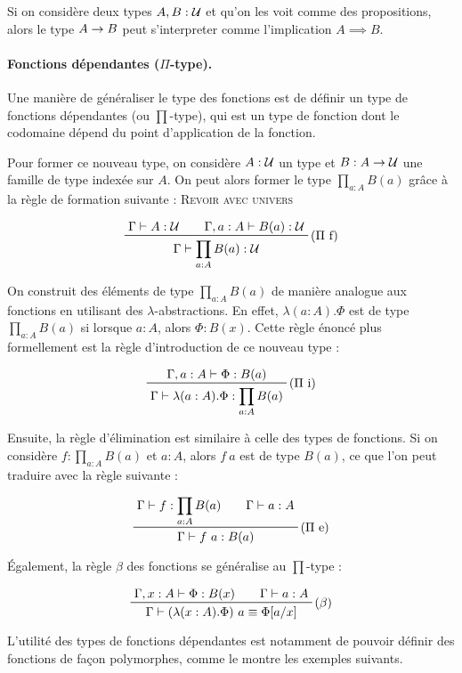 \documentclass[../../rapport.tex]{subfiles}
\begin{document}
  Si on considère deux types $A, B : \mathcal U$ et qu'on les voit comme des propositions,
  alors le type $A \rightarrow B$ peut s'interpreter comme l'implication $A \implies B$.

  \paragraph{Fonctions dépendantes ($\Pi$-type).}

  Une manière de généraliser le type des fonctions est de définir un type de fonctions dépendantes (ou $\prod$-type),
  qui est un type de fonction dont le codomaine dépend du point d'application de la fonction.

  Pour former ce nouveau type, on considère $A : \mathcal U$ un type et $B : A \rightarrow \mathcal U$ une famille de type indexée sur $A$.
  On peut alors former le type $\prod_{a : A}{B(a)}$ grâce à la règle de formation suivante : \textsc{Revoir avec univers}

  $$
  \prfinterspace=2em
  \prftree[r]{($\Pi$ f)}{\Gamma \vdash A : \U}{\Gamma, a : A \vdash B(a) : \U}
    {\Gamma \vdash \prod_{a:A}{B(a)} : \U}
  $$

  On construit des éléments de type $\prod_{a:A}{B(a)}$ de manière analogue aux fonctions en utilisant des $\lambda$-abstractions.
  En effet, $\lambda(a : A). \Phi$ est de type $\prod_{a:A}{B(a)}$ si lorsque $a : A$, alors $\Phi : B(x)$.
  Cette règle énoncé plus formellement est la règle d'introduction de ce nouveau type :

  $$
  \prftree[r]{($\Pi$ i)}{\Gamma, a : A \vdash \Phi : B(a)}
    {\Gamma \vdash \lambda(a : A). \Phi : \prod_{a:A}{B(a)}}
  $$

  Ensuite, la règle d'élimination est similaire à celle des types de fonctions.
  Si on considère $f : \prod_{a:A}B(a)$ et $a : A$, alors $f\ a$ est de type $B(a)$,
  ce que l'on peut traduire avec la règle suivante :

  $$
  \prfinterspace=2em
  \prftree[r]{($\Pi$ e)}{\Gamma \vdash f : \prod_{a:A}{B(a)}}{\Gamma \vdash a : A}
    {\Gamma \vdash f\ a : B(a)}
  $$

  Également, la règle $\beta$ des fonctions se généralise au $\prod$-type :

  $$
  \prfinterspace=2em
  \prftree[r]{($\beta$)}{\Gamma, x : A \vdash \Phi : B(x)}{\Gamma \vdash a : A}
    {\Gamma \vdash (\lambda(x : A).\Phi)\ a \equiv \Phi[a/x]}
  $$

  L'utilité des types de fonctions dépendantes est notamment de pouvoir définir des fonctions de façon polymorphes,
  comme le montre les exemples suivants.
\end{document}
